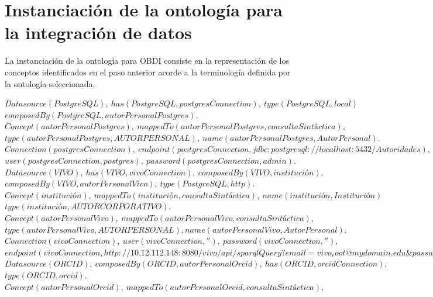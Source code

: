 \section{Instanciación de la ontología para la integración de datos}

La instanciación de la ontología para OBDI consiste en la representación de los conceptos identificados en el paso anterior acorde a la terminología definida por la ontología seleccionada. \\

\begin{minipage}{\textwidth}
$Datasource(PostgreSQL), \ has(PostgreSQL, postgresConnection), \ type(PostgreSQL,local)$ \\
$composedBy(PostgreSQL, autorPersonalPostgres).$ \\
$Concept(autorPersonalPostgres), \ mappedTo(autorPersonalPostgres, consultaSintáctica),$ \\
$type(autorPersonalPostgres,AUTORPERSONAL), \ name(autorPersonalPostgres, Autor Personal).$\\
$Connection(postgresConnection), \ endpoint(postgresConnection, jdbc:postgresql://localhost:5432/Autoridades),$ \\
$user(postgresConnection,postgres), \ password(postgresConnection,admin).$
$Datasource(VIVO), \ has(VIVO, vivoConnection), \ composedBy(VIVO,institución),$ \\
$composedBy(VIVO,autorPersonalVivo), \ type(PostgreSQL,http).$ \\
$Concept(institución), \ mappedTo(institución,consultaSintáctica), \ name(institución, Institución)$ \\
$type(institución,AUTORCORPORATIVO).$\\
$Concept(autorPersonalVivo), \ mappedTo(autorPersonalVivo, consultaSintáctica),$ \\
$type(autorPersonalVivo, AUTORPERSONAL), name(autorPersonalVivo, Autor Personal).$ \\
$Connection(vivoConnection), \ user(vivoConnection, ''), \ password(vivoConnection, ''),$\\
$endpoint(vivoConnection, http://10.12.112.148:8080/vivo/api/sparqlQuery?email=vivo_root@mydomain.edu\&password=zas123..).$
$Datasource(ORCID), \ composedBy(ORCID,autorPersonalOrcid), \ has(ORCID,orcidConnection),$ \\
$type(ORCID, orcid).$ \\
$Concept(autorPersonalOrcid), \ mappedTo(autorPersonalOrcid, consultaSintáctica),$\\

\end{minipage}
